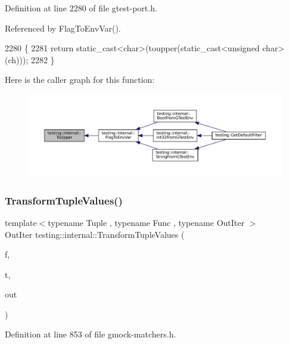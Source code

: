 Definition at line 2280 of file gtest-\/port.\+h.



Referenced by Flag\+To\+Env\+Var().


\begin{DoxyCode}
2280                              \{
2281   \textcolor{keywordflow}{return} \textcolor{keyword}{static\_cast<}\textcolor{keywordtype}{char}\textcolor{keyword}{>}(toupper(static\_cast<unsigned char>(ch)));
2282 \}
\end{DoxyCode}
Here is the caller graph for this function\+:
\nopagebreak
\begin{figure}[H]
\begin{center}
\leavevmode
\includegraphics[width=350pt]{namespacetesting_1_1internal_ac1b876a8133895bd553d4780ecaa1e3a_icgraph}
\end{center}
\end{figure}
\mbox{\label{namespacetesting_1_1internal_a07ba091a64aa2ba95e41accc55dc8855}} 
\subsubsection{\texorpdfstring{Transform\+Tuple\+Values()}{TransformTupleValues()}}
{\footnotesize\ttfamily template$<$typename Tuple , typename Func , typename Out\+Iter $>$ \\
Out\+Iter testing\+::internal\+::\+Transform\+Tuple\+Values (\begin{DoxyParamCaption}\item[{Func}]{f,  }\item[{const Tuple \&}]{t,  }\item[{Out\+Iter}]{out }\end{DoxyParamCaption})}



Definition at line 853 of file gmock-\/matchers.\+h.



